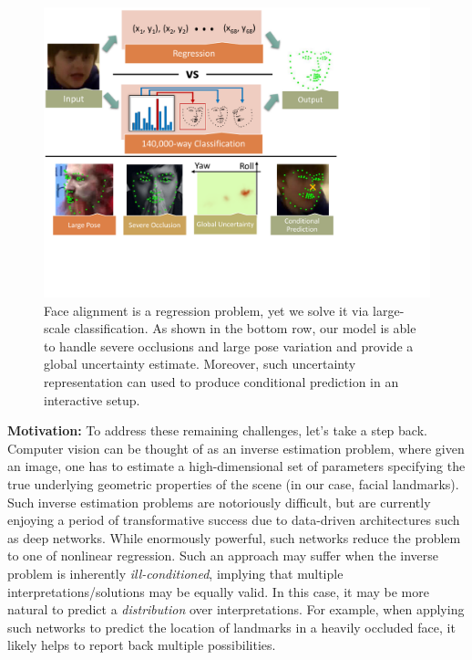 \documentclass[letterpaper]{article} %
\begin{document}
\begin{figure}[t]
\centering
\includegraphics[width=1\linewidth]{fig/Teaser4.pdf}
\caption{Face alignment is a regression problem, yet we solve it via large-scale classification.  As shown in the bottom row, our model is able to handle severe occlusions and large pose variation and provide a global uncertainty estimate. Moreover, such uncertainty representation can used to produce conditional prediction in an interactive setup.}
\label{fig:teaser}
\end{figure}

{\bf Motivation:} To address these remaining challenges, let's take a step back. Computer vision can be thought of as an inverse estimation problem, where given an image, one has to estimate a high-dimensional set of parameters specifying the true underlying geometric properties of the scene (in our case, facial landmarks). Such inverse estimation problems are notoriously difficult, but are currently enjoying a period of transformative success due to data-driven architectures such as deep networks. While enormously powerful, such networks reduce the problem to one of nonlinear regression. Such an approach may suffer when the inverse problem is inherently {\em ill-conditioned}, implying that multiple interpretations/solutions may be equally valid. In this case, it may be more natural to predict a {\em distribution} over interpretations. For example, when applying such networks to predict the location of landmarks in a heavily occluded face, %
it likely helps to report back multiple possibilities.
\end{document}
